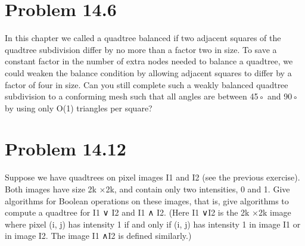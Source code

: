 \documentclass[11pt,psfig]{article}
\begin{document}
\section*{Problem 14.6}

In this chapter we called a quadtree balanced if two adjacent squares of
the quadtree subdivision differ by no more than a factor two in size. To
save a constant factor in the number of extra nodes needed to balance a
quadtree, we could weaken the balance condition by allowing adjacent
squares to differ by a factor of four in size. Can you still complete such
a weakly balanced quadtree subdivision to a conforming mesh such that
all angles are between 45◦ and 90◦ by using only O(1) triangles per
square?

\section*{Problem 14.12}

Suppose we have quadtrees on pixel images I1 and I2 (see the previous
exercise). Both images have size 2k ×2k, and contain only two intensities,
0 and 1. Give algorithms for Boolean operations on these images,
that is, give algorithms to compute a quadtree for I1 ∨ I2 and I1 ∧ I2.
(Here I1 ∨I2 is the 2k ×2k image where pixel (i, j) has intensity 1 if and
only if (i, j) has intensity 1 in image I1 or in image I2. The image I1 ∧I2
is defined similarly.)


\end{document}

